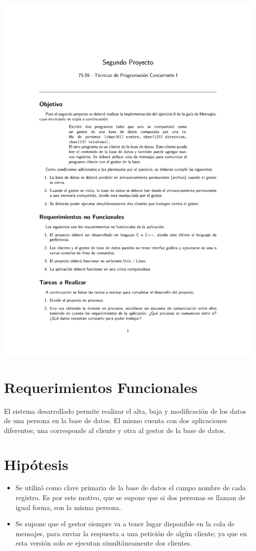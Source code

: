\documentclass[11pt]{article}
\begin{document}
\begin{center}
\includegraphics[trim = 25mm 20mm 10mm 30mm, clip,height=0.95\textheight,width=1.04\textwidth,page={2}]{SegundoProyecto.pdf}
\end{center}

\newpage


\section{Requerimientos Funcionales}

El sistema desarrollado permite realizar el alta, baja y modificaci\'on de los datos de una persona en la base de datos.
El mismo cuenta con dos aplicaciones diferentes; una corresponde al cliente y otra al gestor de la base de datos.


\section{Hip\'otesis}
\begin{itemize}
 \item Se utiliz\'o como clave primaria de la base de datos el campo nombre de cada registro. Es por este motivo, que se supone que si dos 
personas se llaman de igual forma, son la misma persona.
 \item Se supone que el gestor siempre va a tener lugar disponible en la cola de mensajes, para enviar la respuesta a una petición de algún cliente;
ya que en esta versión solo se ejecutan simultáneamente dos clientes.
\end{itemize}
\item 
\end{document}
